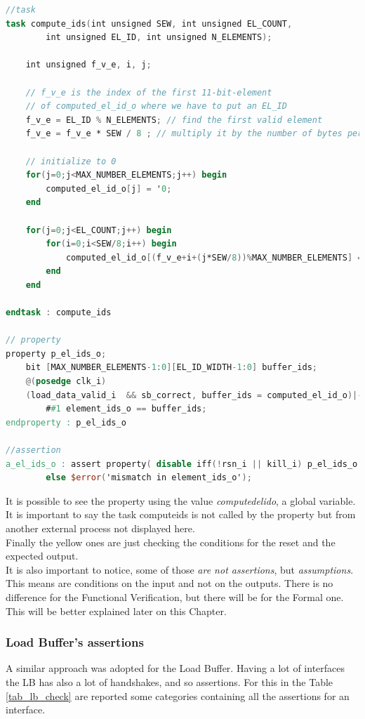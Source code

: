 \begin{lstlisting}[language=Verilog,style=verilog-style]
//task
task compute_ids(int unsigned SEW, int unsigned EL_COUNT, 
	    int unsigned EL_ID, int unsigned N_ELEMENTS);

    int unsigned f_v_e, i, j;
		
    // f_v_e is the index of the first 11-bit-element 
    // of computed_el_id_o where we have to put an EL_ID
	f_v_e = EL_ID % N_ELEMENTS; // find the first valid element 
	f_v_e = f_v_e * SEW / 8 ; // multiply it by the number of bytes per element
		
	// initialize to 0
	for(j=0;j<MAX_NUMBER_ELEMENTS;j++) begin
	    computed_el_id_o[j] = '0;
	end

	for(j=0;j<EL_COUNT;j++) begin
		for(i=0;i<SEW/8;i++) begin
			computed_el_id_o[(f_v_e+i+(j*SEW/8))%MAX_NUMBER_ELEMENTS] = EL_ID+j;
		end
	end

endtask : compute_ids

// property
property p_el_ids_o;
	bit [MAX_NUMBER_ELEMENTS-1:0][EL_ID_WIDTH-1:0] buffer_ids;
	@(posedge clk_i)
	(load_data_valid_i  && sb_correct, buffer_ids = computed_el_id_o)|-> 
        ##1 element_ids_o == buffer_ids;
endproperty : p_el_ids_o

//assertion
a_el_ids_o : assert property( disable iff(!rsn_i || kill_i) p_el_ids_o ) 
        else $error('mismatch in element_ids_o');
\end{lstlisting}
\bigskip

It is possible to see the property using the value \textit{computed\+el\+id\+o}, a global variable. It is important to say the task compute\+ids is not called by the property but from another external process not displayed here.\\

Finally the yellow ones are just checking the conditions for the reset and the expected output.\\

It is also important to notice, some of those \textit{are not assertions}, but \textit{assumptions}. This means are conditions on the input and not on the outputs. There is no difference for the Functional Verification, but there will be for the Formal one. This will be better explained later on this Chapter.\\



\subsubsection{Load Buffer's assertions}
A similar approach was adopted for the Load Buffer. Having a lot of interfaces the LB has also a lot of handshakes, and so assertions. For this in the Table \ref{tab_lb_check} are reported some categories containing all the assertions for an interface.\\

